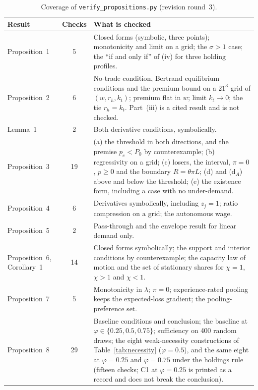 \documentclass[12pt]{article}
\theoremstyle{remark}
\begin{document}
\begin{table}[h]\centering\small
\caption{Coverage of \texttt{verify\_propositions.py} (revision round~3).}\label{tab:coverage}
\begin{tabular}{p{}cp{}}
\toprule
Result & Checks & What is checked\\
\midrule
Proposition~1 & 5 & Closed forms (symbolic, three points); monotonicity and limit on a grid; the $\sigma>1$ case; the ``if and only if'' of (iv) for three holding profiles.\\
Proposition~2 & 6 & No-trade condition, Bertrand equilibrium conditions and the premium bound on a $21^3$ grid of $(w,r_h,k_t)$; premium flat in $w$; limit $k_t\to0$; the tie $r_h=k_t$. Part~(iii) is a cited result and is not checked.\\
Lemma~1 & 2 & Both derivative conditions, symbolically.\\
Proposition~3 & 19 & (a) the threshold in both directions, and the premise $p_e<P_0$ by counterexample; (b) regressivity on a grid; (c) losers, the interval, $\pi=0$, $p\ge0$ and the boundary $R=\theta\pi L$; (d) and (d$_A$) above and below the threshold; (e) the existence form, including a case with no under-demand.\\
Proposition~4 & 6 & Derivatives symbolically, including $z_j=1$; ratio compression on a grid; the autonomous wage.\\
Proposition~5 & 2 & Pass-through and the envelope result for linear demand only.\\
Proposition~6, Corollary~1 & 14 & Closed forms symbolically; the support and interior conditions by counterexample; the capacity law of motion and the set of stationary shares for $\chi=1$, $\chi>1$ and $\chi<1$.\\
Proposition~7 & 5 & Monotonicity in $\lambda$; $\pi=0$; experience-rated pooling keeps the expected-loss gradient; the pooling-preference set.\\
Proposition~8 & 29 & Baseline conditions and conclusion; the baseline at $\varphi\in\{0.25,0.5,0.75\}$; sufficiency on 400 random draws; the eight weak-necessity constructions of Table~\ref{tab:necessity} ($\varphi=0.5$), and the same eight at $\varphi=0.25$ and $\varphi=0.75$ under the holdings rule (fifteen checks; C1 at $\varphi=0.25$ is printed as a record and does not break the conclusion).\\
\bottomrule
\end{tabular}
\end{table}
\end{document}

